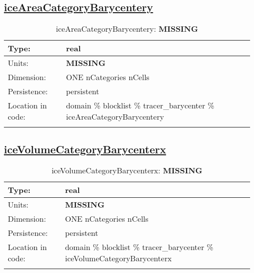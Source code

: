 \subsection[iceAreaCategoryBarycentery]{\hyperref[sec:var_tab_tracer_barycenter]{iceAreaCategoryBarycentery}}
\label{subsec:var_sec_tracer_barycenter_iceAreaCategoryBarycentery}
\begin{center}
\begin{longtable}{| p{2.0in} | p{4.0in} |}
        \hline 
        Type: & real \\
        \hline 
        Units: & {\bf \color{red} MISSING} \\
        \hline 
        Dimension: & ONE nCategories nCells \\
        \hline 
        Persistence: & persistent \\
        \hline 
         Location in code: & domain \% blocklist \% tracer\_barycenter \% iceAreaCategoryBarycentery \\
         \hline 
    \caption{iceAreaCategoryBarycentery: {\bf \color{red} MISSING}}
\end{longtable}
\end{center}
\subsection[iceVolumeCategoryBarycenterx]{\hyperref[sec:var_tab_tracer_barycenter]{iceVolumeCategoryBarycenterx}}
\label{subsec:var_sec_tracer_barycenter_iceVolumeCategoryBarycenterx}
\begin{center}
\begin{longtable}{| p{2.0in} | p{4.0in} |}
        \hline 
        Type: & real \\
        \hline 
        Units: & {\bf \color{red} MISSING} \\
        \hline 
        Dimension: & ONE nCategories nCells \\
        \hline 
        Persistence: & persistent \\
        \hline 
         Location in code: & domain \% blocklist \% tracer\_barycenter \% iceVolumeCategoryBarycenterx \\
         \hline 
    \caption{iceVolumeCategoryBarycenterx: {\bf \color{red} MISSING}}
\end{longtable}
\end{center}
